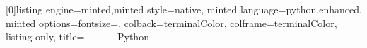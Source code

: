[0]{listing engine=minted,minted style=native,
    minted language=python,enhanced,
    minted options={fontsize=\tiny},  
    colback=terminalColor,
    colframe=terminalColor,
    listing only,
    title=  ~~~~~~Python
}